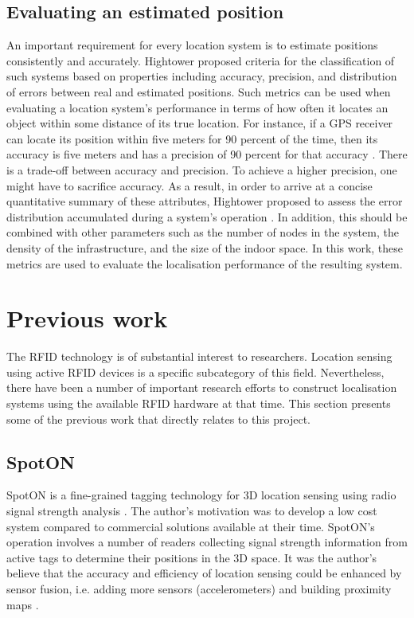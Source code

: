 \subsection{Evaluating an estimated position}

An important requirement for every location system is to estimate positions consistently and accurately. Hightower \cite{Hightower2001c} proposed criteria for the classification of such systems based on properties including accuracy, precision, and distribution of errors between real and estimated positions. Such metrics can be used when evaluating a location system's performance in terms of how often it locates an object within some distance of its true location. For instance, if a GPS receiver can locate its position within five meters for 90 percent of the time, then its accuracy is five meters and has a precision of 90 percent for that accuracy \cite{Hightower2001}. There is a trade-off between accuracy and precision. To achieve a higher precision, one might have to sacrifice accuracy. As a result, in order to arrive at a concise quantitative summary of these attributes, Hightower proposed to assess the error distribution accumulated during a system's operation \cite{Hightower2001}. In addition, this should be combined with other parameters such as the number of nodes in the system, the density of the infrastructure, and the size of the indoor space. In this work, these metrics are used to evaluate the localisation performance of the resulting system.

\section{Previous work}
\label{sec:prevwork}

The RFID technology is of substantial interest to researchers. Location sensing using active RFID devices is a specific subcategory of this field. Nevertheless, there have been a number of important research efforts to construct localisation systems using the available RFID hardware at that time. This section presents some of the previous work that directly relates to this project.


\subsection{SpotON}
\label{sec:spoton}

SpotON is a fine-grained tagging technology for 3D location sensing using radio signal strength analysis \cite{Hightower2000}. The author's motivation was to develop a low cost system compared to commercial solutions available at their time. SpotON's operation involves a number of readers collecting signal strength information from active tags to determine their positions in the 3D space. It was the author's believe that the accuracy and efficiency of location sensing could be enhanced by sensor fusion, i.e. adding more sensors (accelerometers) and building proximity maps \cite{Hightower2000}.

